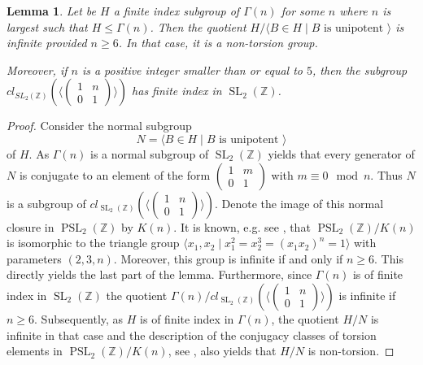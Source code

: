 \documentclass[a4paper,10pt]{amsart}
\newtheorem{lemma}{Lemma}[section]
\theoremstyle{definition}
\theoremstyle{remark}
\newcommand{\SL}{\operatorname{SL}}
\newcommand{\PSL}{\operatorname{PSL}}
\newcommand{\Z}{{\mathbb Z}}
\begin{document}
\begin{lemma}\label{unipotent in congruence of SL2Z}
Let be $H$ a finite index subgroup of $\Gamma(n)$ for some $n$ where $n$ is largest such that $H \leq \Gamma(n)$. Then the quotient $H/ \langle B \in H \mid B \text{ is unipotent } \rangle$ is infinite provided $n \geq 6$. In that case, it is a non-torsion group.

Moreover, if $n$ is a positive integer smaller than or equal to $5$, then the subgroup $cl_{SL_2(\Z)}\left(\langle \begin{pmatrix} 1 & n \\ 0 & 1 \end{pmatrix} \rangle\right)$ has finite index in $\SL_2(\mathbb{Z})$.
\end{lemma}
\begin{proof}
Consider the normal subgroup 
$$N = \langle B \in H \mid B \text{ is unipotent } \rangle$$ of $H$. As $\Gamma(n)$ is a normal subgroup of $\SL_2(\Z)$  yields that every generator of $N$ is conjugate to an element of the form $\begin{pmatrix}
1 & m \\ 0 & 1
\end{pmatrix}$ with $m \equiv 0 \mod n$.  
Thus $N$ is a subgroup of $cl_{\SL_2(\Z)}\left( \langle \begin{pmatrix}
1 & n \\ 0 & 1
\end{pmatrix}\rangle\right)$.  Denote the image of this normal closure in $\PSL_2(\Z)$ by $K(n)$.  It is known, e.g. see \cite[Chapter VIII, Section 13]{NewmanBook}, that $\PSL_2(\Z) / K(n)$ is isomorphic to the triangle group $\langle x_1, x_2 \mid x_1^2 = x_2^3 = (x_1 x_2)^n = 1 \rangle$ with parameters $(2,3,n)$. Moreover, this group is infinite if and only if $n \geq 6$. This directly yields the last part of the lemma. Furthermore, since $\Gamma(n)$ is of finite index in $\SL_2(\Z)$ the quotient $\Gamma(n)/ cl_{\SL_2(\Z)}\left( \langle \begin{pmatrix} 1 & n \\ 0 & 1 \end{pmatrix} \rangle \right)$ is infinite if $n \geq 6$. Subsequently, as $H$ is of finite index in $\Gamma(n)$, the quotient $H/N$ is infinite in that case and the description of the conjugacy classes of torsion elements in $\PSL_2(\Z) / K(n)$, see \cite[Theorem 2.10]{Magnus}, also yields that $H/N$ is non-torsion.  
\end{proof}
\end{document}
